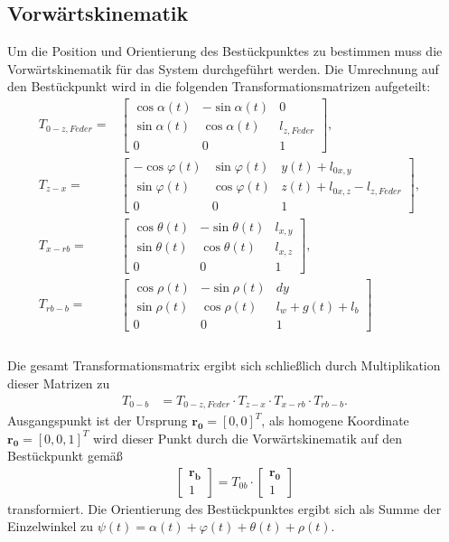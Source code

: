 \documentclass[10pt,a4paper]{iace.report}
\begin{document}
		\subsection{Vorwärtskinematik}
			Um die Position und Orientierung des Bestückpunktes zu bestimmen muss die Vorwärtskinematik für das System durchgeführt werden. Die Umrechnung auf den Bestückpunkt wird in die folgenden Transformationsmatrizen aufgeteilt: 
			\begin{align*}
			 T_{0-z,Feder} = &\begin{bmatrix}\cos\alpha(t) & -\sin\alpha(t) & 0\\\sin\alpha(t) & \cos\alpha(t) & l_{z,Feder}\\0&0&1 \end{bmatrix} , &\\
			 T_{z-x} = &\begin{bmatrix}-\cos\varphi(t) & \sin\varphi(t) & y(t)+l_{0x,y}\\\sin\varphi(t) & \cos\varphi(t) & z(t)+l_{0x,z}-l_{z,Feder}\\0&0&1 \end{bmatrix} , &\\
			 T_{x-rb} = &\begin{bmatrix}\cos\theta(t) & -\sin\theta(t) & l_{x,y}\\\sin\theta(t) & \cos\theta(t) & l_{x,z}\\0&0&1 \end{bmatrix}, &\\ 
			 T_{rb-b} = &\begin{bmatrix}\cos\rho(t) & -\sin\rho(t) & dy\\\sin\rho(t) & \cos\rho(t) & l_{w}+g(t)+l_{b}\\0&0&1 \end{bmatrix}& \\
			\end{align*}\leavevmode\\
			Die gesamt Transformationsmatrix ergibt sich schließlich durch Multiplikation dieser Matrizen zu
			\begin{align*}
				T_{0-b}&= T_{0-z,Feder}\cdot T_{z-x}\cdot T_{x-rb}\cdot T_{rb-b}.
			\end{align*}
			Ausgangspunkt ist der Ursprung $ \bm{r_{0}} = [0, 0]^{T} $, als homogene Koordinate $ \bm{r_{0}} = [0, 0, 1]^{T} $ wird dieser Punkt durch die Vorwärtskinematik auf den Bestückpunkt gemäß
			\begin{align*}
			\begin{bmatrix}\bm{r_{b}}\\1\end{bmatrix} = T_{0b}\cdot\begin{bmatrix}\bm{r_{0}}\\1\end{bmatrix}
			\end{align*}
			transformiert. Die Orientierung des Bestückpunktes ergibt sich als Summe der Einzelwinkel zu $ \psi(t) = \alpha(t)+\varphi(t)+\theta(t)+\rho(t) $.
			
\end{document}
